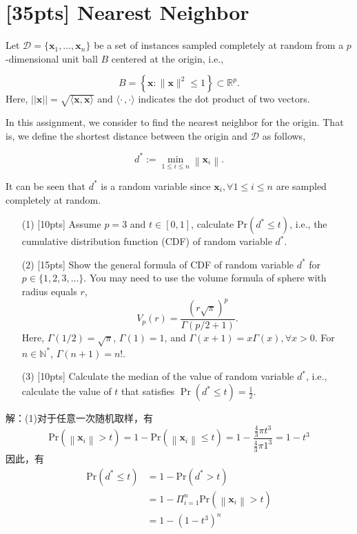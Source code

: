 \documentclass[a4paper,utf8]{article}
\begin{document}
	\newpage
	\section{[35pts] Nearest Neighbor}
	
	Let $\mathcal{D} = \{\mathbf{x}_1, \dots, \mathbf{x}_n\}$ be a set of instances sampled completely at random from a $p$-dimensional unit ball $B$ centered at the origin, i.e.,
	
	\begin{equation}
	B=\left\{\mathbf{x} :\|\mathbf{x}\|^{2} \leq 1\right\} \subset \mathbb{R}^{p}.
	\end{equation}
	Here, $||\mathbf{x}|| = \sqrt{\langle \mathbf{x}, \mathbf{x}\rangle}$ and $\langle \cdot \,, \cdot \rangle$ indicates the dot product of two vectors.
		
	In this assignment, we consider to find the nearest neighbor for the origin. That is, we define the shortest distance between the origin and $\mathcal{D}$ as follows,

	\begin{equation}
	d^{*} :=\min _{1 \leq i \leq n}\left\|\mathbf{x}_{i}\right\|.
	\end{equation}
		
	It can be seen that $d^*$ is a random variable since $\mathbf{x}_i, \forall 1 \leq i \leq n$ are sampled completely at random.	
	
	\begin{enumerate}
		\item [(1)] [10pts] Assume $ p = 3$ and $ t \in [0, 1]$, calculate Pr$(d^* \leq t)$, i.e., the cumulative distribution function (CDF) of random variable $d^*$.
		\item [(2)] [15pts] Show the general formula of CDF of random variable $d^*$ for $p \in \{1, 2, 3, \dots \}$. You may need to use the volume formula of sphere with radius equals $r$,
				\begin{equation}
				V_{p}(r)=\frac{(r \sqrt{\pi})^{p}}{\Gamma(p / 2+1)}.
				\end{equation}
				Here, $\Gamma(1 / 2)=\sqrt{\pi}$, $\Gamma(1)=1$, and $\Gamma(x+1)=x \Gamma(x), \forall x > 0$. For $n \in \mathbb{N}^*$, $\Gamma(n+1)=n!$.
		\item [(3)] [10pts] Calculate the median of the value of random variable $d^*$, i.e., calculate the value of $t$ that satisfies $\operatorname{Pr}\left(d^{*} \leq t\right)= \frac{1}{2}$.
	\end{enumerate}
	
	\noindent
	解：(1)对于任意一次随机取样，有
	\begin{equation}
		\text{Pr}(\left\|\mathbf{x}_{i}\right\|>t)
		=1-\text{Pr}(\left\|\mathbf{x}_{i}\right\|\leq t)
		=1-\frac{\frac{4}{3}\pi t^3}{\frac{4}{3}\pi 1^3}
		=1-t^3
	\end{equation}
	因此，有
	\begin{equation}
		\begin{split}
			\text{Pr}(d^*\leq t)
			& =1-\text{Pr}(d^*>t) \\
			& =1-\Pi_{i=1}^n\text{Pr}(\left\|\mathbf{x}_{i}\right\|>t) \\
			& =1-(1-t^3)^n
		\end{split}
	\end{equation}
\end{document}
